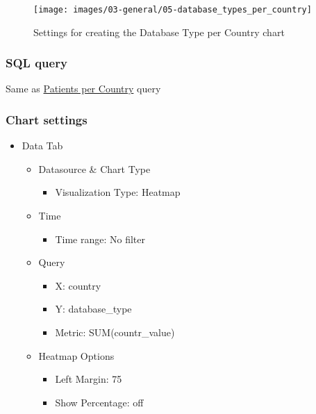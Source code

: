 \documentclass[
]{book}
\providecommand{\tightlist}{%
  \setlength{\itemsep}{0pt}\setlength{\parskip}{0pt}}
\begin{document}
\begin{figure}
\texttt{[image: images/03-general/05-database\_types\_per\_country]} \caption{Settings for creating the Database Type per Country chart}\label{fig:dbsTypesPerCountry}
\end{figure}

\hypertarget{sql-query-3}{%
\subsubsection*{SQL query}\label{sql-query-3}}

Same as \protect\hyperlink{patientsPerCountryQuery}{Patients per Country} query

\hypertarget{chart-settings-4}{%
\subsubsection*{Chart settings}\label{chart-settings-4}}

\begin{itemize}
\tightlist
\item
  Data Tab

  \begin{itemize}
  \tightlist
  \item
    Datasource \& Chart Type

    \begin{itemize}
    \tightlist
    \item
      Visualization Type: Heatmap
    \end{itemize}
  \item
    Time

    \begin{itemize}
    \tightlist
    \item
      Time range: No filter
    \end{itemize}
  \item
    Query

    \begin{itemize}
    \tightlist
    \item
      X: country
    \item
      Y: database\_type
    \item
      Metric: SUM(countr\_value)
    \end{itemize}
  \item
    Heatmap Options

    \begin{itemize}
    \tightlist
    \item
      Left Margin: 75
    \item
      Show Percentage: off
    \end{itemize}
  \end{itemize}
\end{itemize}
\end{document}
